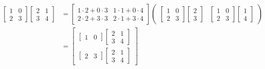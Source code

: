 \begin{exemplo*}
  \begin{align*}
    \begin{bmatrix}
      1 & 0\\
      2 & 3
    \end{bmatrix}
    \begin{bmatrix}
      2 & 1\\
      3 & 4
    \end{bmatrix}
    &= 
    \begin{bmatrix}
      1\cdot 2+0\cdot 3 & 1\cdot 1+0\cdot 4\\
      2\cdot 2+3\cdot 3 & 2\cdot 1+3\cdot 4
    \end{bmatrix}
    \begin{pmatrix}
      \begin{bmatrix}
        1 & 0\\
        2 & 3
      \end{bmatrix}
      \begin{bmatrix}
        2\\3
      \end{bmatrix}
      &
      \begin{bmatrix}
        1 & 0\\
        2 & 3
      \end{bmatrix}
      \begin{bmatrix}
        1\\4
      \end{bmatrix}
    \end{pmatrix}\\
    &= 
    \begin{bmatrix}
      \begin{bmatrix}
        1 & 0
      \end{bmatrix}
      \begin{bmatrix}
        2 & 1\\
        3 & 4
      \end{bmatrix}\\
      \begin{bmatrix}
        2 & 3
      \end{bmatrix}
      \begin{bmatrix}
        2 & 1\\
        3 & 4
      \end{bmatrix}
    \end{bmatrix}
  \end{align*}
\end{exemplo*}


